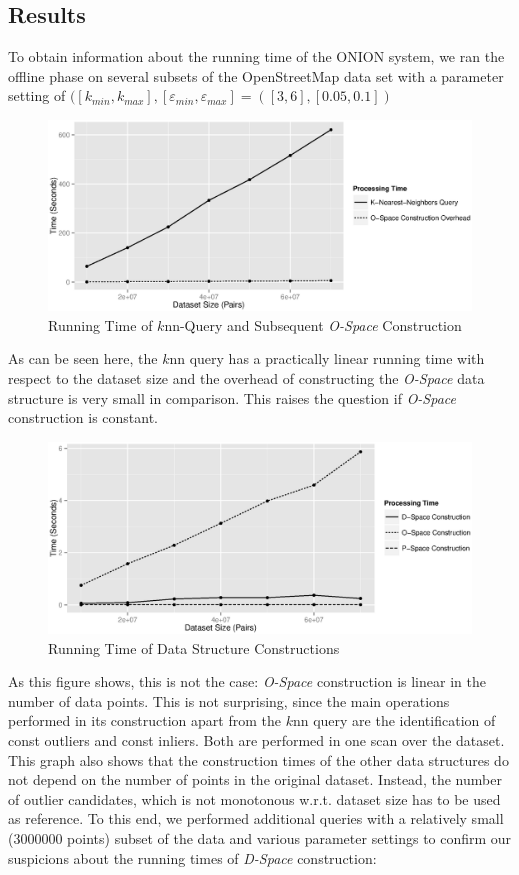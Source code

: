 \documentclass[runningheads]{llncs}
\begin{document}
\subsection{Results}
To obtain information about the running time of the ONION system, we ran the offline phase on several subsets of the OpenStreetMap data set with a parameter setting of $([k_{min},k_{max}],[\varepsilon_{min},\varepsilon_{max}] = ([3,6],[0.05,0.1])$
\begin{figure}[h]
\includegraphics[width=\textwidth]{images/ospace_vs_knn.eps}
\caption{Running Time of $k$nn-Query and Subsequent \emph{O-Space} Construction}
\end{figure}

As can be seen here, the $k$nn query has a practically linear running time with respect to the dataset size and the overhead of constructing the \emph{O-Space} data structure is very small in comparison. This raises the question if \emph{O-Space} construction is constant.


\begin{figure}[H]
\includegraphics[width=\textwidth]{images/spaces_construction.eps}
\caption{Running Time of Data Structure Constructions}
\end{figure}

As this figure shows, this is not the case: \emph{O-Space} construction is linear in the number of data points. This is not surprising, since the main operations performed in its construction apart from the $k$nn query are the identification of const outliers and const inliers. Both are performed in one scan over the dataset.
This graph also shows that the construction times of the other data structures do not depend on the number of points in the original dataset. Instead, the number of outlier candidates, which is not monotonous w.r.t. dataset size has to be used as reference. To this end, we performed additional queries with a relatively small (3000000 points) subset of the data and various parameter settings to confirm our suspicions about the running times of \emph{D-Space} construction:
\end{document}
